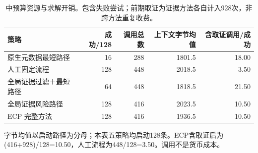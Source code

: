\begin{table}[t]
\caption{中预算资源与求解开销。包含失败尝试；前期取证为证据方法各自计入928次，非跨方法重复收费。}\label{tab:network-cost}
\centering\small
\begin{tabularx}{\textwidth}{Xrrrr}
\toprule
策略 & 成功/128 & 调用总数 & 上下文字节均值 & 含取证调用/成功 \\
\midrule
原生元数据最短路径 & 16 & 288 & 1801.5 & 18.00 \\
人工固定流程 & 128 & 448 & 2018.5 & 3.50 \\
全局证据过滤＋最短路径 & 64 & 448 & 1818.5 & 21.50 \\
全局证据风险路径 & 128 & 416 & 2023.5 & 10.50 \\
ECP 完整方法 & 128 & 416 & 1936.5 & 10.50 \\
\bottomrule
\end{tabularx}
\par\vspace{3pt}\raggedright\footnotesize 字节均值以启动路径为分母；本表五策略均启动128条。ECP含取证后为(416+928)/128=10.50，人工流程为448/128=3.50。调用不是货币成本。
\end{table}
